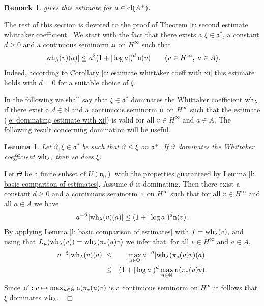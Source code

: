 \documentclass[12pt,a4paper]{article}
\newtheorem{Lemma}[Thm]{Lemma}
\newtheorem{Rem}[Thm]{Remark}
\newenvironment{lemma}[0]{\begin{Lemma}\noindent}%
{\end{Lemma}}
\newenvironment{rem}[0]{\begin{Rem}\noindent\rm}%
{\end{Rem}}
\def\proof{\par\noindent{\it Proof.}{\ }{\ }}
\def\qed{~\hfill\hbox{$\Box$}\medbreak}
\def\qquad{\quad\quad}
\def\msy#1{{\mathbb #1}}
\def\N{{\msy N}}
\def\gl{\lambda}
\def\got#1{\mathfrak #1}
\def\fa{{\got a}}
\def\fn{{\got n}}
\numberwithin{Thm}{section}
\numberwithin{equation}{section}
\numberwithin{equation}{section}
\def\fad{{\fa^*}}
\def\cl{{\rm cl}}
\def\wh{{\rm wh}}
\begin{document}
\begin{rem} \cite[Thm.~15.2.5]{Wrrg2} gives this estimate for  $a \in \cl(A^+).$ 
\end{rem}



The rest of this section is devoted to the proof of Theorem
\ref{t: second estimate whittaker coefficient}. We start with the fact that 
there exists a $\xi \in \fa^*$,  a constant $d \geq 0$ 
and a continuous seminorm ${\rm n}$ on $H^\infty$ 
such that 
\begin{equation} 
\label{e: dominating estimate with xi}
|\wh_\gl(v)(a)| \leq a^\xi (1 + |\log a |)^d \, {\rm n}(v)\qquad (v \in H^\infty, \;a \in A).
\end{equation}
Indeed, according to  Corollary \ref{c: estimate whittaker coeff with xi}
this estimate holds  with $d = 0$ for a suitable choice of $\xi.$ 

In the following we shall say that $\xi \in \fad$ dominates the Whittaker coefficient 
$\wh_{\gl}$ if there exist a $d \in \N$ and a continuous seminorm ${\rm n}$ on 
$H^\infty$ such that the estimate (\ref{e: dominating estimate with xi}) is valid 
for all $v \in H^\infty$ and $a \in A.$ The following result concerning domination
will be useful.

\begin{lemma}
\label{l: domination on fap}
Let $\vartheta, \xi  \in \fad$ be such that $\vartheta \leq \xi $ on $\fa^+.$ 
If $\vartheta $ dominates the Whittaker coefficient $\wh_\gl,$ then so does $\xi.$ 
\end{lemma}

\proof 
Let $\Theta$ be a finite subset of $U(\fn_0)$ with the properties guaranteed by 
Lemma \ref{l: basic comparison of estimates}.  
Assume $\vartheta$ is dominating. Then there exist a constant $d\geq 0$ and a continuous seminorm $\rm n$ on $H^\infty$ 
such that for all $v \in H^\infty$ and all $a\in A$ we have
$$ 
a^{-\vartheta} |\wh_\gl(v)(a)| \leq (1 + |\log a|)^d {\rm n}(v).
$$%
By applying Lemma \ref{l: basic comparison of estimates}  
with $f = \wh_\gl(v),$ and using that 
$L_u(\wh_\gl(v)) = \wh_\gl(\pi_*(u) v)$ we infer that, for all $v \in H^\infty$ and
$a \in A,$  
\begin{eqnarray*}
a^{-\xi} |\wh_\gl(v)(a)|&  \leq & \max_{u \in \Theta} a^{-\vartheta} |\wh_\gl(\pi_*(u)v)(a)|\\
&\leq &
(1+ |\log a|)^d \max_{u \in \Theta}  {\rm n}(\pi_*(u) v).
\end{eqnarray*}
Since ${\rm n}': v \mapsto \max_{u \in \Theta} {\rm n}(\pi_*(u) v)$ is a continuous
seminorm on $H^\infty$ it follows that $\xi$ dominates $\wh_\gl.$ 
\qed
\end{document}
